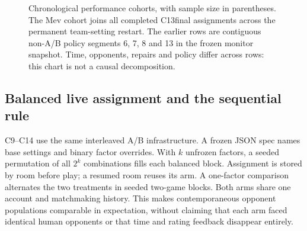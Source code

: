 \begin{figure}[htbp]
\centering
{}
\caption{Chronological performance cohorts, with sample size in parentheses.
The Mev cohort joins all completed C13final assignments across the permanent
team-setting restart. The earlier rows are contiguous non-A/B policy segments
6, 7, 8 and 13 in the frozen monitor snapshot. Time, opponents, repairs and
policy differ across rows: this chart is not a causal decomposition.}
\label{fig:modern-performance}
\end{figure}

\subsection{Balanced live assignment and the sequential rule}
C9--C14 use the same interleaved A/B infrastructure. A frozen JSON spec names
base settings and binary factor overrides. With $k$ unfrozen factors, a
seeded permutation of all $2^k$ combinations fills each balanced block.
Assignment is stored by room before play; a resumed room reuses its arm.
A one-factor comparison alternates the two treatments in seeded two-game
blocks. Both arms share one account and matchmaking history. This makes
contemporaneous opponent populations comparable in expectation, without
claiming that each arm faced identical human opponents or that time and
rating feedback disappear entirely.

